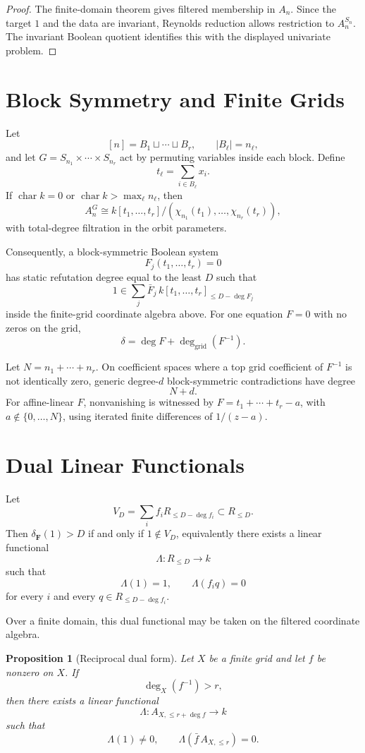 \documentclass[11pt]{article}
\newtheorem{proposition}[theorem]{Proposition}
\DeclareMathOperator{\charac}{char}
\begin{document}
\begin{proof}
The finite-domain theorem gives filtered membership in \(A_n\). Since the target \(1\) and the data are invariant, Reynolds reduction allows restriction to \(A_n^{S_n}\). The invariant Boolean quotient identifies this with the displayed univariate problem.
\end{proof}

\section{Block Symmetry and Finite Grids}

Let
\[
[n]=B_1\sqcup\cdots\sqcup B_r,\qquad |B_\ell|=n_\ell,
\]
and let \(G=S_{n_1}\times\cdots\times S_{n_r}\) act by permuting variables inside each block. Define
\[
t_\ell=\sum_{i\in B_\ell}x_i.
\]
If \(\charac k=0\) or \(\charac k>\max_\ell n_\ell\), then
\[
A_n^G
\cong
k[t_1,\ldots,t_r]/
(\chi_{n_1}(t_1),\ldots,\chi_{n_r}(t_r)),
\]
with total-degree filtration in the orbit parameters.

Consequently, a block-symmetric Boolean system
\[
F_j(t_1,\ldots,t_r)=0
\]
has static refutation degree equal to the least \(D\) such that
\[
1\in
\sum_j \bar F_j\,k[t_1,\ldots,t_r]_{\le D-\deg F_j}
\]
inside the finite-grid coordinate algebra above. For one equation \(F=0\) with no zeros on the grid,
\[
\delta=\deg F+\deg_{\mathrm{grid}}(F^{-1}).
\]

Let \(N=n_1+\cdots+n_r\). On coefficient spaces where a top grid coefficient of \(F^{-1}\) is not identically zero, generic degree-\(d\) block-symmetric contradictions have degree
\[
N+d.
\]
For affine-linear \(F\), nonvanishing is witnessed by \(F=t_1+\cdots+t_r-a\), with \(a\notin\{0,\ldots,N\}\), using iterated finite differences of \(1/(z-a)\).

\section{Dual Linear Functionals}

Let
\[
V_D=\sum_i f_i R_{\le D-\deg f_i}\subset R_{\le D}.
\]
Then \(\delta_{\mathbf F}(1)>D\) if and only if \(1\notin V_D\), equivalently there exists a linear functional
\[
\Lambda:R_{\le D}\to k
\]
such that
\[
\Lambda(1)=1,\qquad
\Lambda(f_iq)=0
\]
for every \(i\) and every \(q\in R_{\le D-\deg f_i}\).

Over a finite domain, this dual functional may be taken on the filtered coordinate algebra.

\begin{proposition}[Reciprocal dual form]
Let \(X\) be a finite grid and let \(f\) be nonzero on \(X\). If
\[
\deg_X(f^{-1})>r,
\]
then there exists a linear functional
\[
\Lambda:A_{X,\le r+\deg f}\to k
\]
such that
\[
\Lambda(1)\ne0,\qquad
\Lambda(\bar f\,A_{X,\le r})=0.
\]
\end{proposition}
\end{document}
